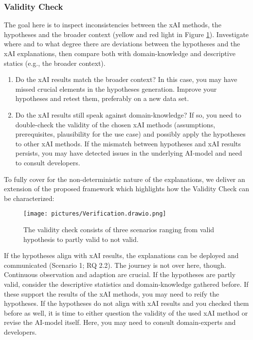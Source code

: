 \subsubsection{\textbf{Validity Check}}
The goal here is to inspect inconsistencies between the xAI methods, the hypotheses and the broader context (yellow and red light in Figure \ref{fig:validitycheck}). Investigate where and to what degree there are deviations between the hypotheses and the xAI explanations, then compare both with domain-knowledge and descriptive statics (e.g., the broader context).
\begin{enumerate}
    \item Do the xAI results match the broader context? In this case, you may have missed crucial elements in the hypotheses generation. Improve your hypotheses and retest them, preferably on a new data set.
    \item Do the xAI results still speak against domain-knowledge? If so, you need to double-check the validity of the chosen xAI methods (assumptions, prerequisites, plausibility for the use case) and possibly apply the hypotheses to other xAI methods. If the mismatch between hypotheses and xAI results persists, you may have detected issues in the underlying AI-model and need to consult developers.
\end{enumerate}

To fully cover for the non-deterministic nature of the explanations, we deliver an extension of the proposed framework which highlights how the Validity Check can be characterized:

\begin{figure}[H]
    \centering
    \texttt{[image: pictures/Verification.drawio.png]}
    \caption{The validity check consists of three scenarios ranging from valid hypothesis to partly valid to not valid.}
    \label{fig:validitycheck}
\end{figure}

If the hypotheses align with xAI results, the explanations can be deployed and communicated (Scenario 1; RQ 2.2). The journey is not over here, though. Continuous observation and adaption are crucial.
If the hypotheses are partly valid, consider the descriptive statistics and domain-knowledge gathered before. If these support the results of the xAI methods, you may need to reify the hypotheses.
If the hypotheses do not align with xAI results and you checked them before as well, it is time to either question the validity of the used xAI method or revise the AI-model itself. Here, you may need to consult domain-experts and developers.


